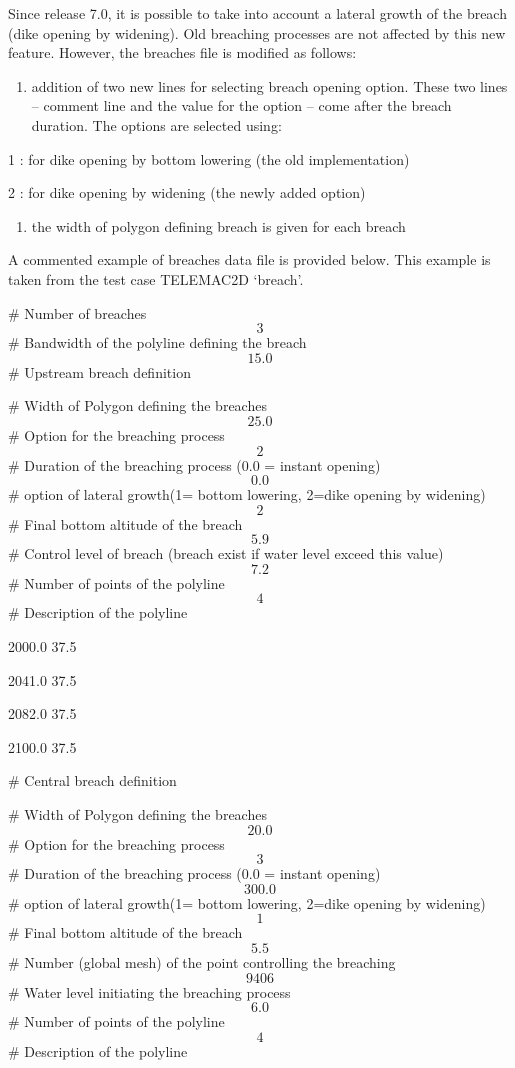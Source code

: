  Since release 7.0, it is possible to take into account a lateral growth of the breach (dike opening by widening). Old breaching processes are not affected by this new feature. However, the breaches file is modified as follows:

\begin{enumerate}
\item  addition of two new lines for selecting breach opening option. These two lines -- comment line and the value for the option -- come after the breach duration. The options are selected using:
\end{enumerate}

 1 : for dike opening by bottom lowering (the old implementation)

 2 : for dike opening by widening (the newly added option)

\begin{enumerate}
\item  the width of polygon defining breach is given for each breach
\end{enumerate}

 A commented example of breaches data file is provided below. This example is taken from the test case TELEMAC2D `breach'.



 \# Number of breaches
\[3\]
\# Bandwidth of the polyline defining the breach
\[15.0\]
\# Upstream breach definition

 \# Width of Polygon defining the breaches
\[25.0\]
\# Option for the breaching process
\[2\]
\# Duration of the breaching process (0.0 = instant opening)
\[0.0\]
\# option of lateral growth(1= bottom lowering, 2=dike opening by widening)
\[2\]
\# Final bottom altitude of the breach
\[5.9\]
\# Control level of breach (breach exist if water level exceed this value)
\[7.2\]
\# Number of points of the polyline
\[4\]
\# Description of the polyline

 2000.0 37.5

 2041.0 37.5

 2082.0 37.5

 2100.0 37.5

 \# Central breach definition

 \# Width of Polygon defining the breaches
\[20.0\]
\# Option for the breaching process
\[3\]
\# Duration of the breaching process (0.0 = instant opening)
\[300.0\]
\# option of lateral growth(1= bottom lowering, 2=dike opening by widening)
\[1\]
\# Final bottom altitude of the breach
\[5.5\]
\# Number (global mesh) of the point controlling the breaching
\[9406\]
\# Water level initiating the breaching process
\[6.0\]
\# Number of points of the polyline
\[4\]
\# Description of the polyline

